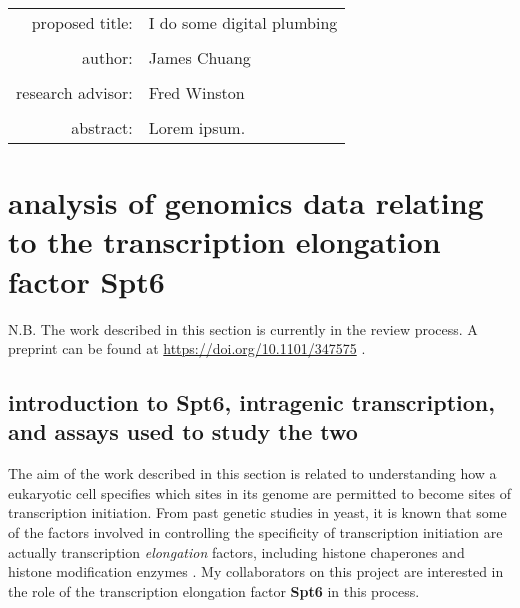 \documentclass[11pt, a4paper]{article}
\begin{document}
\begin{titlepage}
\begin{tabular}{ r l }
 proposed title:   & I do some digital plumbing \\
 		   & \\
 author:	   & James Chuang \\
 		   & \\
 research advisor: & Fred Winston \\
 		   & \\
 abstract:	   & Lorem ipsum.
\end{tabular}
\end{titlepage}

\tableofcontents

\section{analysis of genomics data relating to the transcription elongation factor Spt6}

N.B. The work described in this section is currently in the review process. A preprint can be found at \url{https://doi.org/10.1101/347575} \cite{doris2018}.

\subsection{introduction to Spt6, intragenic transcription, and assays used to study the two}

The aim of the work described in this section is related to understanding how a eukaryotic cell specifies which sites in its genome are permitted to become sites of transcription initiation. From past genetic studies in yeast, it is known that some of the factors involved in controlling the specificity of transcription initiation are actually transcription \textit{elongation} factors, including histone chaperones and histone modification enzymes \cite{kaplan2003, cheung2008, hennig2013}. My collaborators on this project are interested in the role of the transcription elongation factor \textbf{Spt6} in this process.
\end{document}
